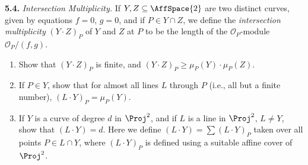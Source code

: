 {\smallskip
\noindent\hypertarget{ex-I-5.4}{}\textbf{5.4.} \emph{Intersection Multiplicity.} If $Y,Z\subseteq\AffSpace{2}$ are two distinct curves, given by equations $f=0$, $g=0$, and if $P\in Y\cap Z$, we define the \emph{intersection multiplicity} $(Y\cdot Z)_P$ of $Y$ and $Z$ at $P$ to be the length of the $\mathcal O_P$-module $\mathcal O_P/(f,g)$.
\begin{enumerate}[label=(\alph*),leftmargin=2.4em,nosep]
\item Show that $(Y\cdot Z)_P$ is finite, and $(Y\cdot Z)_P\ge\mu_P(Y)\cdot\mu_P(Z)$.
\item If $P\in Y$, show that for almost all lines $L$ through $P$ (i.e., all but a finite number), $(L\cdot Y)_P=\mu_P(Y)$.
\item If $Y$ is a curve of degree $d$ in $\Proj^2$, and if $L$ is a line in $\Proj^2$, $L\ne Y$, show that $(L\cdot Y)=d$. Here we define $(L\cdot Y)=\sum(L\cdot Y)_P$ taken over all points $P\in L\cap Y$, where $(L\cdot Y)_P$ is defined using a suitable affine cover of $\Proj^2$.
\end{enumerate}}
